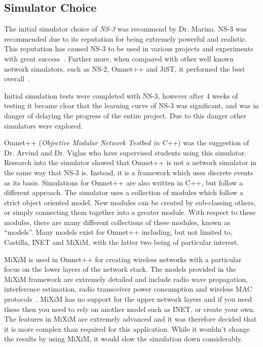         \subsection{Simulator Choice}\label{simulation_simulator_options_simulator_choice}

            The initial simulator choice of \emph{NS-3} was recommend by Dr. Marina. NS-3 was recommended due to its reputation for being extremely powerful and realistic. This reputation has caused NS-3 to be used in various projects and experiments with great success~\cite{highperformancesimulatorofadhocnetworks}.  Further more, when compared with other well known network simulators, such as NS-2, Omnet++ and JiST, it performed the best overall~\cite{networksimulatorcomparison}. 

            Initial simulation tests were completed with NS-3, however after 4 weeks of testing it became clear that the learning curve of NS-3 was significant, and was in danger of delaying the progress of the entire project. Due to this danger other simulators were explored. 

            Omnet++ (\emph{Objective Modular Network Testbed in C++}) was the suggestion of Dr. Arvind and Dr. Viglas who have supervised students using this simulator. Research into the simulator showed that Omnet++ is not a network simulator in the same way that NS-3 is. Instead, it is a framework which uses discrete events as its basis. Simulations for Omnet++ are also written in C++, but follow a different approach. The simulator uses a collection of modules which follow a strict object oriented model. New modules can be created by sub-classing others, or simply connecting them together into a greater module. With respect to these modules, there are many different collections of these modules, known as ``models''. Many models exist for Omnet++ including, but not limited to, Castilla, INET and MiXiM, with the latter two being of particular interest. 

            MiXiM is used in Omnet++ for creating wireless networks with a particular focus on the lower layers of the network stack. The models provided in the MiXiM framework are extremely detailed and include radio wave propagation, interference estimation, radio transceiver power consumption and wireless MAC protocols~\cite{miximvision}. MiXiM has no support for the upper network layers and if you need these then you need to rely on another model such as INET, or create your own. The features in MiXiM are extremely advanced and it was therefore decided that it is more complex than required for this application. While it wouldn't change the results by using MiXiM, it would slow the simulation down considerably.


